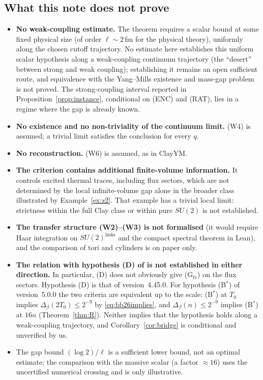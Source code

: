 \documentclass[11pt,a4paper]{article}
\theoremstyle{plain}
\theoremstyle{definition}
\theoremstyle{remark}
\numberwithin{equation}{section}
\begin{document}
\subsection{What this note does not prove}\label{sec:notprove}
\begin{itemize}
\item \textbf{No weak-coupling estimate.} The theorem requires a scalar bound at some fixed physical size (of order $\ell\sim2$\,fm
for the physical theory), uniformly along the chosen cutoff trajectory. No estimate here establishes this uniform scalar hypothesis along a weak-coupling continuum trajectory (the ``desert'' between strong and weak coupling); establishing it remains an open sufficient route, and equivalence with the Yang--Mills existence and mass-gap problem is not proved. The strong-coupling interval reported in Proposition~\ref{prop:instance}, conditional on (ENC) and (RAT), lies in a regime where the gap is already known.
\item \textbf{No existence and no non-triviality of the continuum limit.} (W4) is assumed; a trivial limit satisfies the conclusion
for every $q$.
\item \textbf{No reconstruction.} (W6) is assumed, as in ClayYM.
\item \textbf{The criterion contains additional finite-volume information.} It controls excited thermal traces, including flux
sectors, which are not determined by the local infinite-volume gap alone in the broader class illustrated by Example~\ref{ex:z2}. That example
has a trivial local limit: strictness within the full Clay class or within pure $SU(2)$ is not established.
\item \textbf{The transfer structure (W2)--(W3) is not formalised} (it would require Haar integration on $SU(2)^{\text{links}}$ and the
compact spectral theorem in Lean), and the comparison of tori and cylinders is on paper only.
\item \textbf{The relation with hypothesis (D) of \cite{BB26} is not established in either direction.} In particular, (D) does not
obviously give (G$_{\mathrm{fv}}$) on the flux sectors. Hypothesis (D) is that of version~4.45.0. For hypothesis (B$^*$) of version~5.0.0
\cite{BB26v5} the two criteria are equivalent up to the scale: (B$^*$) at $T_0$ implies $\Delta_\beta(2T_0)\le2^{-9}$ by \eqref{eq:bb26implies}, and $\Delta_\beta(n)\le2^{-9}$ implies (B$^*$) at $16n$ (Theorem~\ref{thm:R}). Neither implies that the hypothesis holds along a weak-coupling trajectory, and Corollary~\ref{cor:bridge} is conditional and unverified by us.
\item The gap bound $(\log2)/\ell$ is a sufficient lower bound, not an optimal estimate; the comparison with the massive scalar (a factor
$\approx16$) uses the uncertified numerical crossing and is only illustrative.
\end{itemize}
\end{document}
